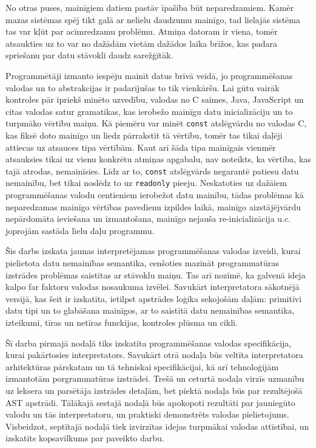 \documentclass[12pt,a4paper]{report}
\begin{document}
No otras puses, mainīgiem datiem pastāv īpašība būt neparedzamiem. Kamēr mazas sistēmas spēj tikt galā ar nelielu daudzumu mainīgo, tad lielajās sistēma tas var kļūt par acīmredzamu problēmu. Atmiņa datoram ir viena, tomēr atsaukties uz to var no dažādām vietām dažādos laika brīžos, kas padara spriešanu par datu stāvokli daudz sarežģītāk.  

Programmētāji izmanto iespēju mainīt datus brīvā veidā, jo  programmēšanas valodas un to abstrakcijas ir padarījušas to tik vienkāršu. Lai gūtu vairāk kontroles pār ipriekš minēto uzvedību, valodas no C saimes, Java, JavaScript un citas valodas satur gramatikas, kas ierobežo mainīgu datu inicializāciju un to turpmāko vērtību maiņu. Kā piemēru var minēt \texttt{const} atslēgvārdu no valodas C, kas fiksē doto mainīgo un liedz pārrakstīt tā vērtību, tomēr tas tikai daļēji attiecas uz atsauces tipa vērtībām. Kaut arī šāda tipa mainīgais vienmēr atsauksies tikai uz vienu konkrētu atmiņas apgabalu, nav noteikts, ka vērtība, kas tajā atrodas, nemainīsies. Līdz ar to, \texttt{const} atslēgvārds negarantē patiesu datu nemainību, bet tikai noslēdz to uz \texttt{readonly} pieeju.
Neskatoties uz dažāiem programmēšanas valodu centieniem ierobežot datu mainību, tādas problēmas kā neparedzamas mainīgo vērtības pavedienu izpildes laikā, mainīgo aizstājējvārdu nepārdomāta ieviešana un izmantošana, mainīgo nejauša re-inicializācija u.c. joprojām sastāda lielu daļu programmu.\cite{immutability}

Šis darbs izskata jaunas interpretējamas programmēšanas valodas izveidi, kurai pielietota datu nemainības semantika, cenšoties mazināt programmatūras izstrādes problēmas saistītas ar stāvoklu maiņu. Tas arī nozīmē, ka galvenā ideja kalpo far faktoru valodas nosaukuma izvēlei. Savukārt interpretatora sākotnējā versijā, kas šeit ir izskatīta, ietilpst apstrādes loģika sekojošām daļām: primitīvi datu tipi un to glabāšana mainīgos, ar to saistītā datu nemainības semantika, izteikumi, tīras un netīras funckijas, kontroles plūsma un cikli.


Šī darba pirmajā nodaļā tiks izskatīta programmēšanas valodas specifikācija, kurai pakārtosies interpretators. Savukārt otrā nodaļa būs veltīta interpretatora arhitektūras pārskatam un tā tehniskai specifikācijai, kā arī tehnoloģijām izmantotām porgrammatūras izstrādei. Trešā un ceturtā nodaļa virzīs uzmanību uz leksera un parsētāja izstrādes detaļām, bet piektā nodaļa būs par rezultējošā AST apstrādi. Tālākajā sestajā nodaļā būs apokopoti rezultāti par jauniegūto valodu un tās interpretatoru, un praktiski demonstrēts valodas pielietojums. Visbeidzot, septītajā nodaļā tiek izvirzītas idejas turpmākai valodas attīstībai, un izskatīts kopsavilkums par paveikto darbu.
\end{document}
